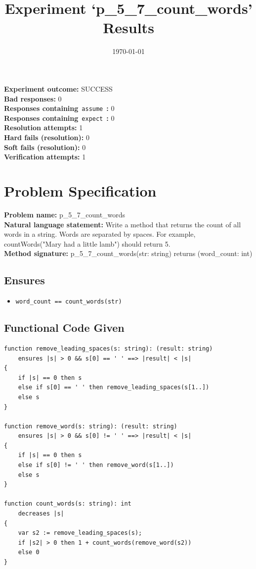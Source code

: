 \documentclass{article}
\begin{document}
\title{Experiment `p\_5\_7\_count\_words' Results}
\author{\today}
\date{}
\maketitle
\textbf{Experiment outcome: }SUCCESS
\\\textbf{Bad responses: }0
\\\textbf{Responses containing}~\texttt{assume}~\textbf{: }0
\\\textbf{Responses containing}~\texttt{expect}~\textbf{: }0
\\\textbf{Resolution attempts: }1
\\\textbf{Hard fails (resolution): }0
\\\textbf{Soft fails (resolution): }0
\\\textbf{Verification attempts: }1
\section*{Problem Specification}
\textbf{Problem name: }p\_5\_7\_count\_words
\\\textbf{Natural language statement: }Write a method that returns the count of all words in a string. Words are separated by spaces. For example, countWords("Mary had a little lamb") should return 5.
\\\textbf{Method signature: }p\_5\_7\_count\_words(str: string) returns (word\_count: int)
\subsection*{Ensures}
\begin{itemize}
\item \texttt{word\_count == count\_words(str)}
\end{itemize}
\subsection*{Functional Code Given}
\begin{lstlisting}
function remove_leading_spaces(s: string): (result: string)
    ensures |s| > 0 && s[0] == ' ' ==> |result| < |s|
{
    if |s| == 0 then s
    else if s[0] == ' ' then remove_leading_spaces(s[1..])
    else s
}

function remove_word(s: string): (result: string)
    ensures |s| > 0 && s[0] != ' ' ==> |result| < |s|
{
    if |s| == 0 then s
    else if s[0] != ' ' then remove_word(s[1..])
    else s
}

function count_words(s: string): int
    decreases |s|
{
    var s2 := remove_leading_spaces(s);
    if |s2| > 0 then 1 + count_words(remove_word(s2))
    else 0
}
\end{lstlisting}
\clearpage
\end{document}

